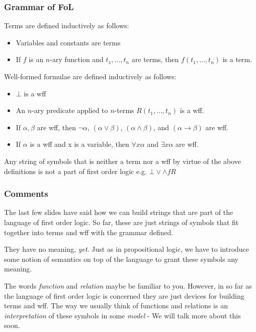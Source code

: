 \documentclass{beamer}
\theoremstyle{indentDefn} \newtheorem{defn}[]{Definition}
\begin{document}
\begin{frame}
	\frametitle{Grammar of FoL}
	
	Terms are defined inductively as follows: 
	
	\begin{itemize}
		\item Variables and constants are terms
		\item If $f$ is an $n$-ary function and $t_{1}, ... , t_{n}$ are terms, then $f(t_{1}, ... , t_{n})$ is a term.
	\end{itemize}


	\vspace{1cm}

	Well-formed formulae are defined inductively as follows: 
	
	\begin{itemize}
		\item $\bot$ is a wff
		\item An $n$-ary predicate applied to $n$-terms $R(t_{1}, ... , t_{n})$ is a wff.
		\item If $\alpha, \beta$ are wff, then $\lnot \alpha$, $(\alpha \lor \beta)$, $(\alpha \land \beta)$, and $(\alpha \rightarrow \beta)$ are wff.
		\item If $\alpha$ is a wff and x is a variable, then $\forall x \alpha$ and $\exists x \alpha$ are wff. 
	\end{itemize}

	
	\vspace{0.4cm}
	
	Any string of symbols that is neither a term nor a wff by virtue of the above definitions is not a part of first order logic e.g. $\bot \lor \land fR$
	
\end{frame}

\begin{frame}
	\frametitle{Comments}
	
	The last few slides have said how we can build strings that are part of the language of first order logic. So far, these are just strings of symbols that fit together into terms and wff with the grammar defined. 
	
	\vspace{0.5cm}
	
	They have no meaning, \emph{yet}. Just as in propositional logic, we have to introduce some notion of semantics on top of the language to grant these symbols any meaning. 
	
	\vspace{0.5cm}
	
	The words \emph{function} and \emph{relation} maybe be familiar to you. However, in so far as the language of first order logic is concerned they are just devices for building terms and wff. The way we usually think of functions and relations is an \emph{interpretation} of these symbols in some \emph{model} - We will talk more about this soon. 
	
\end{frame}
\end{document}
